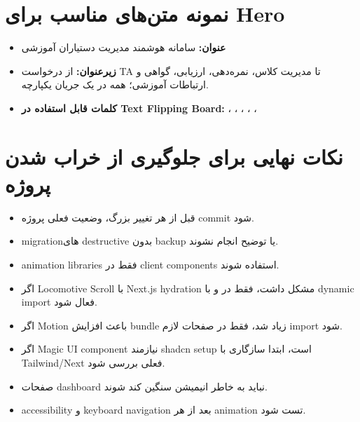 \documentclass[12pt,a4paper]{article}
\newcommand{\code}[1]{\lr{\texttt{\detokenize{#1}}}}
\begin{document}
\section{نمونه متن‌های مناسب برای Hero}
\begin{itemize}
  \item \textbf{عنوان:} سامانه هوشمند مدیریت دستیاران آموزشی
  \item \textbf{زیرعنوان:} از درخواست TA تا مدیریت کلاس، نمره‌دهی، ارزیابی، گواهی و ارتباطات آموزشی؛ همه در یک جریان یکپارچه.
  \item \textbf{کلمات قابل استفاده در Text Flipping Board:} ، ، ، ، ، 
\end{itemize}

\section{نکات نهایی برای جلوگیری از خراب شدن پروژه}
\begin{itemize}
  \item قبل از هر تغییر بزرگ، وضعیت فعلی پروژه commit شود.
  \item migrationهای destructive بدون backup یا توضیح انجام نشوند.
  \item animation libraries فقط در client components استفاده شوند.
  \item اگر Locomotive Scroll با Next.js hydration مشکل داشت، فقط در \code{useEffect} و با dynamic import فعال شود.
  \item اگر Motion باعث افزایش bundle زیاد شد، فقط در صفحات لازم import شود.
  \item اگر Magic UI component نیازمند shadcn setup است، ابتدا سازگاری با Tailwind/Next فعلی بررسی شود.
  \item صفحات dashboard نباید به خاطر انیمیشن سنگین کند شوند.
  \item accessibility و keyboard navigation بعد از هر animation تست شود.
\end{itemize}
\end{document}
